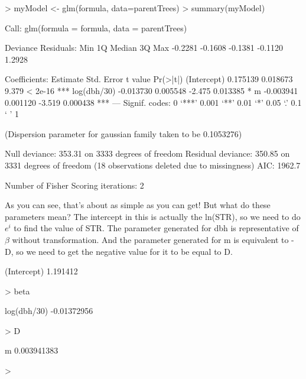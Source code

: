 \documentclass{report}
\begin{document}
\begin{Schunk}
\begin{Sinput}
> myModel <- glm(formula, data=parentTrees)
> summary(myModel)
\end{Sinput}
\begin{Soutput}
Call:
glm(formula = formula, data = parentTrees)

Deviance Residuals: 
    Min       1Q   Median       3Q      Max  
-0.2281  -0.1608  -0.1381  -0.1120   1.2928  

Coefficients:
             Estimate Std. Error t value Pr(>|t|)    
(Intercept)  0.175139   0.018673   9.379  < 2e-16 ***
log(dbh/30) -0.013730   0.005548  -2.475 0.013385 *  
m           -0.003941   0.001120  -3.519 0.000438 ***
---
Signif. codes:  0 ‘***’ 0.001 ‘**’ 0.01 ‘*’ 0.05 ‘.’ 0.1 ‘ ’ 1

(Dispersion parameter for gaussian family taken to be 0.1053276)

    Null deviance: 353.31  on 3333  degrees of freedom
Residual deviance: 350.85  on 3331  degrees of freedom
  (18 observations deleted due to missingness)
AIC: 1962.7

Number of Fisher Scoring iterations: 2
\end{Soutput}
\end{Schunk}

As you can see, that's about as simple as you can get! But what do these parameters mean? The intercept in this is actually the ln(STR), so we need to do $e^i$ to find the value of STR. The parameter generated for dbh is representative of $\beta$ without transformation. And the parameter generated for m is equivalent to -D, so we need to get the negative value for it to be equal to D.

\begin{Schunk}
\begin{Soutput}
(Intercept) 
   1.191412 
\end{Soutput}
\begin{Sinput}
> beta
\end{Sinput}
\begin{Soutput}
log(dbh/30) 
-0.01372956 
\end{Soutput}
\begin{Sinput}
> D
\end{Sinput}
\begin{Soutput}
          m 
0.003941383 
\end{Soutput}
\begin{Sinput}
> 
\end{Sinput}
\end{Schunk}
\end{document}
